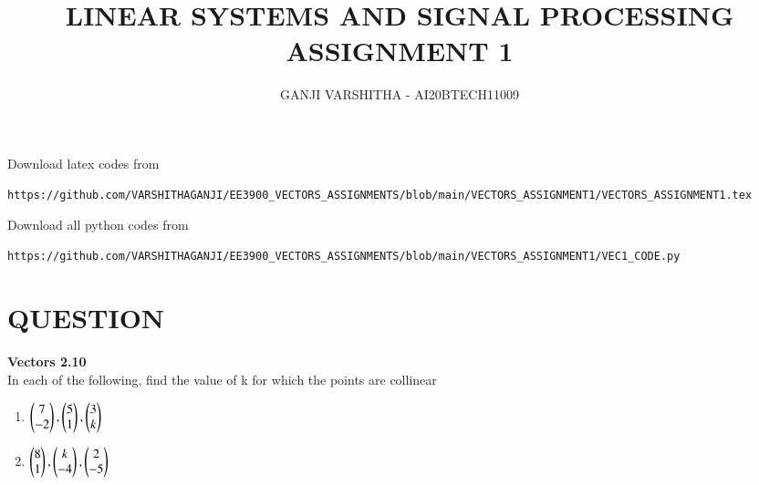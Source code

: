 \documentclass[journal,12pt,twocolumn]{IEEEtran}
\begin{document}
\let\vec\mathbf
\renewcommand{\thefigure}{\theproblem}
\def\putbox#1#2#3{\makebox[0in][l]{\makebox[#1][l]{}\raisebox{\baselineskip}[0in][0in]{\raisebox{#2}[0in][0in]{#3}}}}
     \def\rightbox#1{\makebox[0in][r]{#1}}
     \def\centbox#1{\makebox[0in]{#1}}
     \def\topbox#1{\raisebox{-\baselineskip}[0in][0in]{#1}}
     \def\midbox#1{\raisebox{-0.5\baselineskip}[0in][0in]{#1}}
\vspace{3cm}
\title{\textbf{LINEAR SYSTEMS AND SIGNAL PROCESSING \\ ASSIGNMENT 1}}
\author{GANJI VARSHITHA - AI20BTECH11009}
\maketitle
\newpage
\bigskip
\renewcommand{\thefigure}{\arabic{figure}}
\renewcommand{\thetable}{\arabic{table}}
Download latex codes from 
%
\begin{lstlisting}
https://github.com/VARSHITHAGANJI/EE3900_VECTORS_ASSIGNMENTS/blob/main/VECTORS_ASSIGNMENT1/VECTORS_ASSIGNMENT1.tex
\end{lstlisting}



Download all python codes from
\begin{lstlisting}
https://github.com/VARSHITHAGANJI/EE3900_VECTORS_ASSIGNMENTS/blob/main/VECTORS_ASSIGNMENT1/VEC1_CODE.py
\end{lstlisting}




\section*{QUESTION}
\textbf{Vectors 2.10}
\\
In each of the following, find the value of k for which the points are collinear

\begin{enumerate}
   \item  $\begin{pmatrix}7\\-2\end{pmatrix}, \begin{pmatrix}5 \\ 1\end{pmatrix}, \begin{pmatrix}3 \\ k\end{pmatrix}$
   \item  $\begin{pmatrix}8\\1\end{pmatrix}, \begin{pmatrix}k \\ -4\end{pmatrix}, \begin{pmatrix}2 \\ -5\end{pmatrix}$
 
\end{enumerate}
\end{document}
